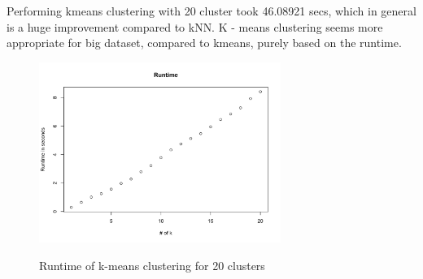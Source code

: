 \documentclass[10pt,a4paper]{article}
\begin{document}
\begin{figure}[H]
  		 \hspace{1em}
	\end{figure}


Performing kmeans clustering with 20 cluster took 46.08921 secs, which in general is a huge improvement compared to kNN.   K - means clustering seems more appropriate for big dataset,  compared to kmeans, purely based on the runtime. 

\begin{figure}[H]
\centering
\includegraphics[width = 0.7\textwidth]{runtime.png}
\label{fig:runtime}
\caption{Runtime of k-means clustering for 20 clusters}
\end{figure}
\end{document}

